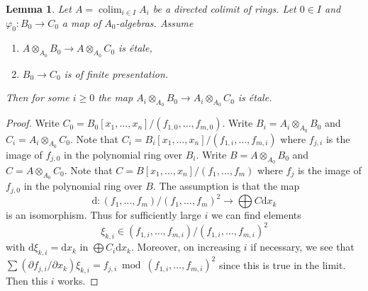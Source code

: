 \documentclass[10pt,a4paper]{amsart}
\theoremstyle{plain}
\newtheorem{lemma}[subsection]{Lemma}
\theoremstyle{definition}
\theoremstyle{remark}
\numberwithin{equation}{subsection}
\def\colim{\mathop{\mathrm{colim}}\nolimits}
\begin{document}
\begin{lemma}
\label{lemma-colimit-etale}
Let $A = \colim_{i \in I} A_i$ be a directed colimit of rings.
Let $0 \in I$ and $\varphi_0 : B_0 \to C_0$ a map of $A_0$-algebras.
Assume
\begin{enumerate}
\item $A \otimes_{A_0} B_0 \to A \otimes_{A_0} C_0$ is \'etale,
\item $B_0 \to C_0$ is of finite presentation.
\end{enumerate}
Then for some $i \geq 0$ the map
$A_i \otimes_{A_0} B_0 \to A_i \otimes_{A_0} C_0$
is \'etale.
\end{lemma}

\begin{proof}
Write $C_0 = B_0[x_1, \ldots, x_n]/(f_{1, 0}, \ldots, f_{m, 0})$.
Write $B_i = A_i \otimes_{A_0} B_0$ and $C_i = A_i \otimes_{A_0} C_0$.
Note that $C_i = B_i[x_1, \ldots, x_n]/(f_{1, i}, \ldots, f_{m, i})$
where $f_{j, i}$ is the image of $f_{j, 0}$ in the polynomial ring
over $B_i$. Write $B = A \otimes_{A_0} B_0$ and $C = A \otimes_{A_0} C_0$.
Note that $C = B[x_1, \ldots, x_n]/(f_1, \ldots, f_m)$
where $f_j$ is the image of $f_{j, 0}$ in the polynomial ring
over $B$. The assumption is that the map
$$
\text{d} :
(f_1, \ldots, f_m)/(f_1, \ldots, f_m)^2
\longrightarrow
\bigoplus C \text{d}x_k
$$
is an isomorphism. Thus for sufficiently large $i$ we can find elements
$$
\xi_{k, i} \in (f_{1, i}, \ldots, f_{m, i})/(f_{1, i}, \ldots, f_{m, i})^2
$$
with $\text{d}\xi_{k, i} = \text{d}x_k$ in $\bigoplus C_i \text{d}x_k$.
Moreover, on increasing $i$ if necessary, we see that
$\sum (\partial f_{j, i}/\partial x_k) \xi_{k, i} =
f_{j, i} \bmod (f_{1, i}, \ldots, f_{m, i})^2$
since this is true in the limit. Then this $i$ works.
\end{proof}
\end{document}
